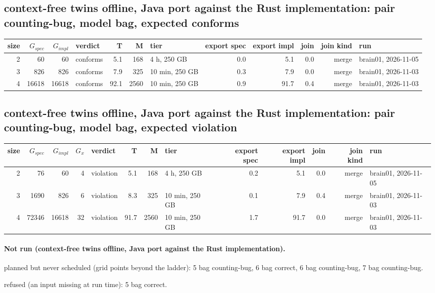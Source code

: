 \documentclass[10pt]{article}
\begin{document}
\subsection*{context-free twins offline, Java port against the Rust implementation: pair \textsf{counting-bug}, model bag, expected conforms}
\begin{longtable}{@{}rrrlrrlrrrrl@{}}
\toprule
size & $G_{\mathit{spec}}$ & $G_{\mathit{impl}}$ & verdict & T & M & tier & export spec & export impl & join & join kind & run \\
\midrule
\endhead
\color{blue} 2 & 60 & 60 & conforms & 5.1 & 168 & 4 h, 250 GB & 0.0 & 5.1 & 0.0 & merge & brain01, 2026-11-05 \\
\color{blue} 3 & 826 & 826 & conforms & 7.9 & 325 & 10 min, 250 GB & 0.3 & 7.9 & 0.0 & merge & brain01, 2026-11-03 \\
\color{blue} 4 & 16618 & 16618 & conforms & 92.1 & 2560 & 10 min, 250 GB & 0.9 & 91.7 & 0.4 & merge & brain01, 2026-11-03 \\
\bottomrule
\end{longtable}
\subsection*{context-free twins offline, Java port against the Rust implementation: pair \textsf{counting-bug}, model bag, expected violation}
\begin{longtable}{@{}rrrrlrrlrrrrl@{}}
\toprule
size & $G_{\mathit{spec}}$ & $G_{\mathit{impl}}$ & $G_x$ & verdict & T & M & tier & export spec & export impl & join & join kind & run \\
\midrule
\endhead
\color{blue} 2 & 76 & 60 & 4 & violation & 5.1 & 168 & 4 h, 250 GB & 0.2 & 5.1 & 0.0 & merge & brain01, 2026-11-05 \\
\color{blue} 3 & 1690 & 826 & 6 & violation & 8.3 & 325 & 10 min, 250 GB & 0.1 & 7.9 & 0.4 & merge & brain01, 2026-11-03 \\
\color{blue} 4 & 72346 & 16618 & 32 & violation & 91.7 & 2560 & 10 min, 250 GB & 1.7 & 91.7 & 0.0 & merge & brain01, 2026-11-03 \\
\bottomrule
\end{longtable}
\paragraph{Not run (context-free twins offline, Java port against the Rust implementation).}
planned but never scheduled (grid points beyond the ladder): 5 bag counting-bug, 6 bag correct, 6 bag counting-bug, 7 bag counting-bug.\par
refused (an input missing at run time): 5 bag correct.\par
\end{document}
